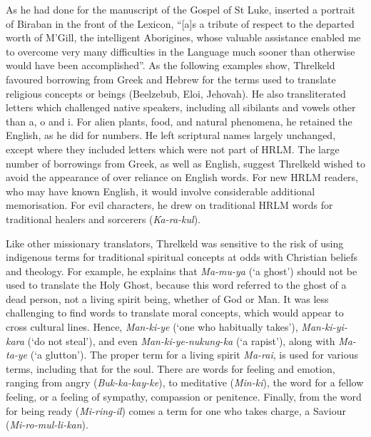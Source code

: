 {As he had done for the manuscript of the Gospel of St Luke, \citet[fol. 5]{threlkeld_aboriginal_1859} inserted a portrait of Biraban in the front of the Lexicon, “[a]s a tribute of respect to the departed worth of M’Gill, the intelligent Aborigines, whose valuable assistance enabled me to overcome very many difficulties in the Language much sooner than otherwise would have been accomplished”. As the following examples show, Threlkeld favoured borrowing from Greek and Hebrew for the terms used to translate religious concepts or beings (Beelzebub, Eloi, Jehovah). He also transliterated letters which challenged native speakers, including all sibilants and vowels other than a, o and i. For alien plants, food, and natural phenomena, he retained the English, as he did for numbers. He left scriptural names largely unchanged, except where they included letters which were not part of HRLM. The large number of borrowings from Greek, as well as English, suggest Threlkeld wished to avoid the appearance of over reliance on English words. For new HRLM readers, who may have known English, it would involve considerable additional memorisation. For evil characters, he drew on traditional HRLM words for traditional healers and sorcerers (\textit{Ka-ra-kul}). 

Like other missionary translators, Threlkeld was sensitive to the risk of using indigenous terms for traditional spiritual concepts at odds with Christian beliefs and theology. For example, he explains that \textit{Ma-mu-ya} (‘a ghost’) should not be used to translate the Holy Ghost, because this word referred to the ghost of a dead person, not a living spirit being, whether of God or Man. It was less challenging to find words to translate moral concepts, which would appear to cross cultural lines. Hence, \textit{Man-ki-ye} (‘one who habitually takes’), \textit{Man-ki-yi-kara} (‘do not steal’), and even \textit{Man-ki-ye-nukung-ka} (‘a rapist’), along with \textit{Ma-ta-ye} (‘a glutton’). The proper term for a living spirit \textit{Ma-rai}, is used for various terms, including that for the soul. There are words for feeling and emotion, ranging from angry (\textit{Buk-ka-kay-ke}), to meditative (\textit{Min-ki}), the word for a fellow feeling, or a feeling of sympathy, compassion or penitence. Finally, from the word for being ready (\textit{Mi-ring-il}) comes a term for one who takes charge, a Saviour (\textit{Mi-ro-mul-li-kan}).

}
